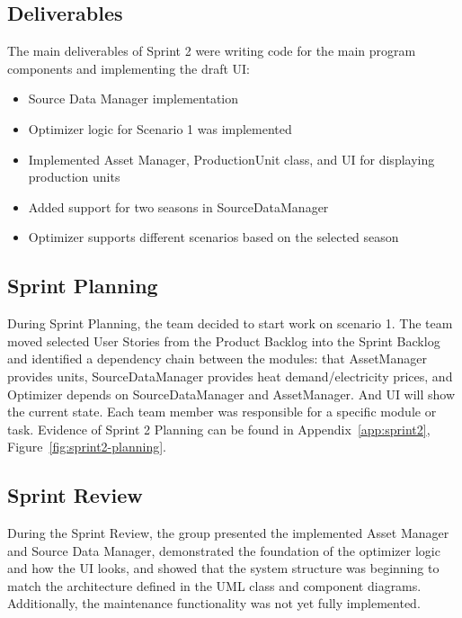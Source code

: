 \subsection*{Deliverables}

The main deliverables of Sprint 2 were writing code for the main program components and implementing the draft UI:

  \begin{itemize}
    \item Source Data Manager implementation
    
    \item Optimizer logic for Scenario 1 was implemented
    
    \item  Implemented Asset Manager, ProductionUnit class, and UI for displaying production units

    \item Added support for two seasons in SourceDataManager

    \item Optimizer supports different scenarios based on the selected season

\end{itemize}



\subsection*{Sprint Planning}

During Sprint Planning, the team decided to start work on scenario 1. The team moved selected User Stories from the Product Backlog into the Sprint Backlog and identified a dependency chain between the modules: that AssetManager provides units, SourceDataManager provides heat demand/electricity prices, and Optimizer depends on SourceDataManager and AssetManager. And UI will show the current state. Each team member was responsible for a specific module or task. Evidence of Sprint 2 Planning can be found in Appendix~\ref{app:sprint2}, Figure~\ref{fig:sprint2-planning}.

 

\subsection*{Sprint Review}

During the Sprint Review, the group presented the implemented Asset Manager and Source Data Manager, demonstrated the foundation of the optimizer logic and how the UI looks, and showed that the system structure was beginning to match the architecture defined in the UML class and component diagrams. Additionally, the maintenance functionality was not yet fully implemented. 

